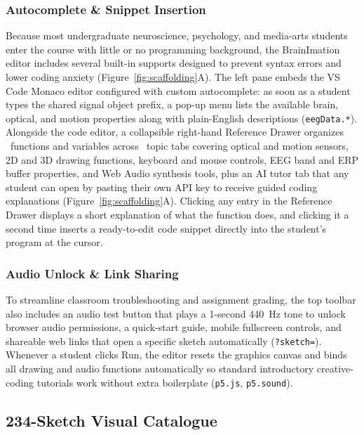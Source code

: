 \documentclass[11pt]{article}
\begin{document}
\subsubsection{Autocomplete \& Snippet Insertion}
Because most undergraduate neuroscience, psychology, and media-arts students enter the course with little or no programming background, the BrainImation editor includes several built-in supports designed to prevent syntax errors and lower coding anxiety \citep{iemi2026icancode} (Figure~\ref{fig:scaffolding}A). The left pane embeds the VS Code Monaco editor configured with custom autocomplete: as soon as a student types the shared signal object prefix, a pop-up menu lists the available brain, optical, and motion properties along with plain-English descriptions (\texttt{eegData.*}). Alongside the code editor, a collapsible right-hand Reference Drawer organizes \NRefAPIs\ functions and variables across \NRefTabs\ topic tabs covering optical and motion sensors, 2D and 3D drawing functions, keyboard and mouse controls, EEG band and ERP buffer properties, and Web Audio synthesis tools, plus an AI tutor tab that any student can open by pasting their own API key to receive guided coding explanations \citep{clindeffarges2026socrates} (Figure~\ref{fig:scaffolding}A). Clicking any entry in the Reference Drawer displays a short explanation of what the function does, and clicking it a second time inserts a ready-to-edit code snippet directly into the student's program at the cursor.

\subsubsection{Audio Unlock \& Link Sharing}
To streamline classroom troubleshooting and assignment grading, the top toolbar also includes an audio test button that plays a 1-second 440~Hz tone to unlock browser audio permissions, a quick-start guide, mobile fullscreen controls, and shareable web links that open a specific sketch automatically (\texttt{?sketch=}). Whenever a student clicks Run, the editor resets the graphics canvas and binds all drawing and audio functions automatically so standard introductory creative-coding tutorials work without extra boilerplate (\texttt{p5.js}, \texttt{p5.sound}).

\subsection{234-Sketch Visual Catalogue}
\end{document}
